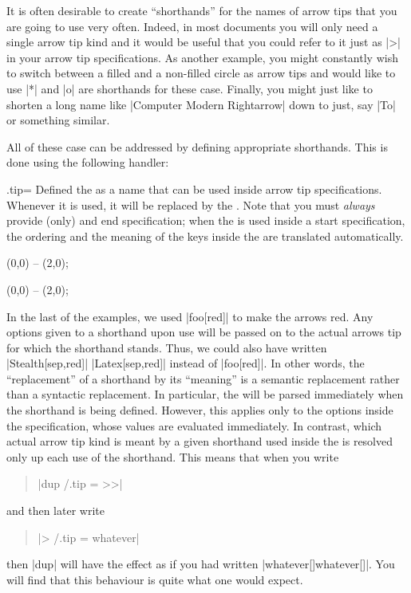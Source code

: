 It is often desirable to create ``shorthands'' for the names of arrow
tips that you are going to use very often. Indeed, in most documents
you will only need a single arrow tip kind and it would be useful that
you could refer to it just as |>| in your arrow tip specifications. As
another example, you might constantly wish to switch between a filled
and a non-filled circle as arrow tips and would like to use |*| and
|o| are shorthands for these case. Finally, you might just like to
shorten a long name like |Computer Modern Rightarrow| down to just,
say |To| or something similar.

All of these case can be addressed by defining appropriate
shorthands. This is done using the following handler:

\begin{handler}{{.tip}{=}}
  Defined the  as a name that can be used inside arrow tip
  specifications. Whenever it is used, it will be replaced by the
  . Note that you must \emph{always} provide
  (only) and end specification; when the  is used inside a
  start specification, the ordering and the meaning of the keys inside
  the  are translated automatically.

\begin{codeexample}[]
\tikz [foo /.tip = {Stealth[sep]. >>}]
  \draw [-foo] (0,0) -- (2,0);  
\end{codeexample}
\begin{codeexample}[]
\tikz [foo /.tip = {Stealth[sep] Latex[sep]},
       bar /.tip = {Stealth[length=10pt,open]}]
   (0,0) -- (2,0);  
\end{codeexample}

  In the last of the examples, we used |foo[red]| to make the arrows
  red. Any options given to a shorthand upon use will be passed on to
  the actual arrows tip for which the shorthand stands. Thus, we could
  also have written |Stealth[sep,red]| |Latex[sep,red]| instead of
  |foo[red]|. In other words, the ``replacement'' of a shorthand by
  its ``meaning'' is a semantic replacement rather than a syntactic
  replacement. In particular, the  will be
  parsed immediately when the shorthand is being defined. However,
  this applies only to the options inside the specification, whose
  values are evaluated immediately. In contrast, which actual arrow
  tip kind is meant by a given shorthand used inside the  is resolved only up each use of the shorthand. This
  means that when you write
  \begin{quote}
    |dup /.tip = >>|
  \end{quote}
  and then later write
  \begin{quote}
    |> /.tip = whatever|
  \end{quote}
  then |dup| will have the effect as if you had written
  |whatever[]whatever[]|. You will find that this behaviour is quite
  what one would expect.


\end{handler}
